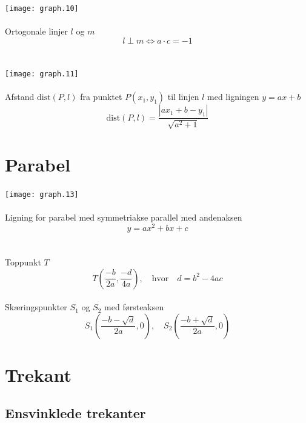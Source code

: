 \documentclass[11pt,a5paper,fleqn,leqno]{book}
\begin{document}
\newpage

\texttt{[image: graph.10]}
\\
\\
Ortogonale linjer $l$ og $m$
\begin{equation}
l \perp m \Leftrightarrow a \cdot c = -1
\end{equation}
\\
\\
\texttt{[image: graph.11]}
\\
\\
Afstand $\text{dist}(P,l)$ fra punktet $P(x_1,y_1)$ til linjen $l$ med ligningen $y = ax+b$
\begin{equation}
\text{dist}(P,l) = \frac{|ax_1 + b - y_1|}{\sqrt{a^2 + 1}}
\end{equation}

\vfill

\section{Parabel}

\texttt{[image: graph.13]}
\\
\\
Ligning for parabel med symmetriakse parallel med andenaksen
\begin{equation}
y = ax^2 + bx +c
\end{equation}
\\
\\
Toppunkt $T$
\begin{equation} \label{eq:parabel_toppunkt}
T\left(\frac{-b}{2a}, \frac{-d}{4a}\right), \quad \text{hvor} \quad d = b^2 - 4ac
\end{equation}
\\
Skæringspunkter $S_1$ og $S_2$ med førsteaksen
\begin{equation} \label{eq:parabel_roedder}
S_1\left(\frac{-b - \sqrt{d}}{2a}, 0\right), \quad S_2\left(\frac{-b + \sqrt{d}}{2a}, 0\right)
\end{equation}

\newpage

\section{Trekant}

\subsection{Ensvinklede trekanter}
\end{document}
